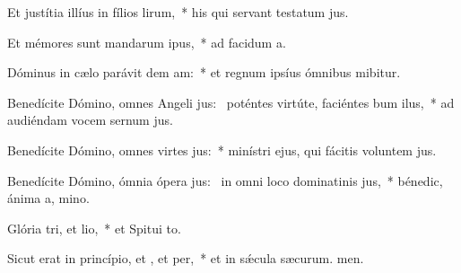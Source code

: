 \item Et justítia illíus in fílios lirum,~* his qui servant testatum jus.
\item Et mémores sunt mandarum ipus,~* ad facidum a.
\item Dóminus in cælo parávit dem am:~* et regnum ipsíus ómnibus mibitur.
\item Benedícite Dómino, omnes Angeli jus:~\pscross{} poténtes virtúte, faciéntes bum ilus,~* ad audiéndam vocem sernum jus.
\item Benedícite Dómino, omnes virtes jus:~* minístri ejus, qui fácitis voluntem jus.
\item Benedícite Dómino, ómnia ópera jus:~\pscross{} in omni loco dominatinis jus,~* bénedic, ánima a, mino.
\item Glória tri, et lio,~* et Spitui to.
\item Sicut erat in princípio, et , et per,~* et in sǽcula sæcurum. men.
